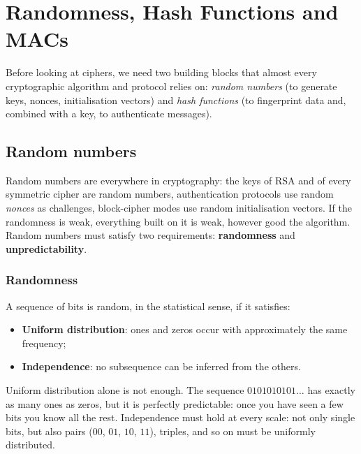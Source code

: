 \section{Randomness, Hash Functions and MACs}
\label{sec:base-mechanisms}

Before looking at ciphers, we need two building blocks that almost every cryptographic algorithm and protocol relies on: \emph{random numbers} (to generate keys, nonces, initialisation vectors) and \emph{hash functions} (to fingerprint data and, combined with a key, to authenticate messages).

\subsection{Random numbers}

Random numbers are everywhere in cryptography: the keys of RSA and of every symmetric cipher are random numbers, authentication protocols use random \emph{nonces} as challenges, block-cipher modes use random initialisation vectors. If the randomness is weak, everything built on it is weak, however good the algorithm. Random numbers must satisfy two requirements: \textbf{randomness} and \textbf{unpredictability}.

\subsubsection{Randomness}

\begin{definition}
A sequence of bits is random, in the statistical sense, if it satisfies:
\begin{itemize}
    \item \textbf{Uniform distribution}: ones and zeros occur with approximately the same frequency;
    \item \textbf{Independence}: no subsequence can be inferred from the others.
\end{itemize}
\end{definition}

Uniform distribution alone is not enough. The sequence $0101010101\dots$ has exactly as many ones as zeros, but it is perfectly predictable: once you have seen a few bits you know all the rest. Independence must hold at every scale: not only single bits, but also pairs ($00$, $01$, $10$, $11$), triples, and so on must be uniformly distributed.

